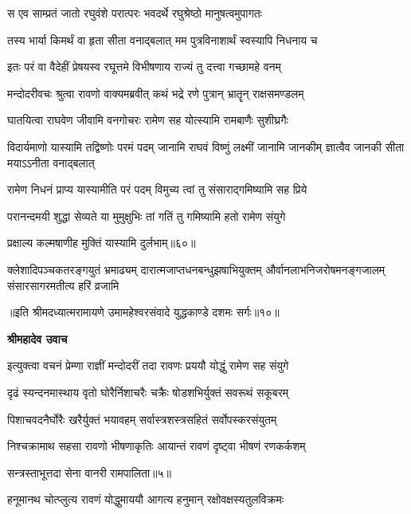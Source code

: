 \twolineshloka
{स एव साम्प्रतं जातो रघुवंशे परात्परः}
{भवदर्थे रघुश्रेष्ठो मानुषत्वमुपागतः} %

\twolineshloka
{तस्य भार्या किमर्थं वा हृता सीता वनाद्बलात्}
{मम पुत्रविनाशार्थं स्वस्यापि निधनाय च} %

\twolineshloka
{इतः परं वा वैदेहीं प्रेषयस्व रघूत्तमे}
{विभीषणाय राज्यं तु दत्त्वा गच्छामहे वनम्} %

\twolineshloka
{मन्दोदरीवचः श्रुत्वा रावणो वाक्यमब्रवीत्}
{कथं भद्रे रणे पुत्रान् भ्रातॄन् राक्षसमण्डलम्} %

\twolineshloka
{घातयित्वा राघवेण जीवामि वनगोचरः}
{रामेण सह योत्स्यामि रामबाणैः सुशीघ्रगैः} %

\threelineshloka
{विदार्यमाणो यास्यामि तद्विष्णोः परमं पदम्}
{जानामि राघवं विष्णुं लक्ष्मीं जानामि जानकीम्}
{ज्ञात्वैव जानकी सीता मयाऽऽनीता वनाद्बलात्} %

\twolineshloka
{रामेण निधनं प्राप्य यास्यामीति परं पदम्}
{विमुच्य त्वां तु संसाराद्गमिष्यामि सह प्रिये} %

\twolineshloka
{परानन्दमयी शुद्धा सेव्यते या मुमुक्षुभिः}
{तां गतिं तु गमिष्यामि हतो रामेण संयुगे} %

{प्रक्षाल्य कल्मषाणीह मुक्तिं यास्यामि दुर्लभाम्॥६०॥} %


\fourlineindentedshloka
{क्लेशादिपञ्चकतरङ्गयुतं भ्रमाढ्यम्}
{दारात्मजाप्तधनबन्धुझषाभियुक्तम्}
{और्वानलाभनिजरोषमनङ्गजालम्}
{संसारसागरमतीत्य हरिं व्रजामि} %

{॥इति श्रीमदध्यात्मरामायणे उमामहेश्वरसंवादे युद्धकाण्डे दशमः
सर्गः॥१०॥
}




\textbf{श्रीमहादेव उवाच}

\twolineshloka
{इत्युक्त्वा वचनं प्रेम्णा राज्ञीं मन्दोदरीं तदा}
{रावणः प्रययौ योद्धुं रामेण सह संयुगे} %

\twolineshloka
{दृढं स्यन्दनमास्थाय वृतो घोरैर्निशाचरैः}
{चक्रैः षोडशभिर्युक्तं सवरूथं सकूबरम्} %

\twolineshloka
{पिशाचवदनैर्घोरैः खरैर्युक्तं भयावहम्}
{सर्वास्त्रशस्त्रसहितं सर्वोपस्करसंयुतम्} %

\twolineshloka
{निश्चक्रामाथ सहसा रावणो भीषणाकृतिः}
{आयान्तं रावणं दृष्ट्वा भीषणं रणकर्कशम्} %

{सन्त्रस्ताभूत्तदा सेना वानरी रामपालिता॥५॥} %


\twolineshloka
{हनूमानथ चोत्प्लुत्य रावणं योद्धुमाययौ}
{आगत्य हनुमान् रक्षोवक्षस्यतुलविक्रमः} %

